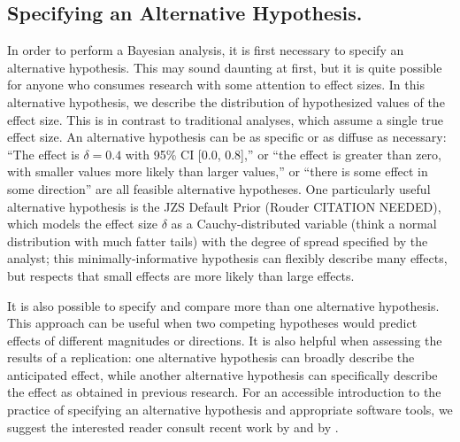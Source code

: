 \documentclass[fignum,nobf,man]{apa}
\begin{document}
\subsection{Specifying an Alternative Hypothesis.  }
In order to perform a Bayesian analysis, it is first necessary to specify an alternative hypothesis. This may sound daunting at first, but it is quite possible for anyone who consumes research with some attention to effect sizes. In this alternative hypothesis, we describe the distribution of hypothesized values of the effect size. This is in contrast to traditional analyses, which assume a single true effect size. An alternative hypothesis can be as specific or as diffuse as necessary: ``The effect is $\delta = 0.4$ with 95\% CI [0.0, 0.8],'' or ``the effect is greater than zero, with smaller values more likely than larger values,'' or ``there is some effect in some direction'' are all feasible alternative hypotheses. One particularly useful alternative hypothesis is the JZS Default Prior (Rouder CITATION NEEDED), which models the effect size $\delta$ as a Cauchy-distributed variable (think a normal distribution with much fatter tails) with the degree of spread specified by the analyst; this minimally-informative hypothesis can flexibly describe many effects, but respects that small effects are more likely than large effects.

It is also possible to specify and compare more than one alternative hypothesis. This approach can be useful when two competing hypotheses would predict effects of different magnitudes or directions. It is also helpful when assessing the results of a replication: one alternative hypothesis can broadly describe the anticipated effect, while another alternative hypothesis can specifically describe the effect as obtained in previous research. \citep[see][for an example]{Boekel:etal:in press} %
For an accessible introduction to the practice of specifying an alternative hypothesis and appropriate software tools, we suggest the interested reader consult recent work by \citet{Dienes:2011,Dienes:2014} and by \citet{Rouder:etal:2012a, Rouder:etal:2012b}. %
\end{document}
